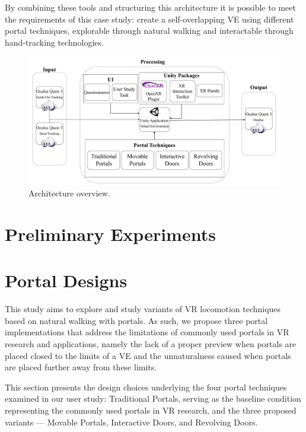 By combining these tools and structuring this architecture it is possible to meet the requirements of this case study: create a self-overlapping 
\gls{VE} using different portal techniques, explorable through natural walking and interactable through hand-tracking technologies.

\begin{figure}[t]
    \includegraphics[width=\textwidth]{NOVAthesisFiles/Images/schemes/architecture-overview.drawio.pdf}
    \centering
     \caption[Overview of the architecture of the solution.]
     {Architecture overview.}
     \label{fig:architecture}
\end{figure}


\section{Preliminary Experiments}
\label{sec:preliminary}


\section{Portal Designs}
\label{sec:portal-design}

This study aims to explore and study variants of \gls{VR} locomotion techniques based on natural walking with portals. As such, we propose three 
portal implementations that address the limitations of commonly used portals in \gls{VR} research and applications, namely the lack of a proper 
preview when portals are placed closed to the limits of a \gls{VE} and the unnaturalness caused when portals are placed further away from these 
limits.

This section presents the design choices underlying the four portal techniques examined in our user study: Traditional Portals, serving as the baseline 
condition representing the commonly used portals in \gls{VR} research, and the three proposed variants — Movable Portals, 
Interactive Doors, and Revolving Doors.

